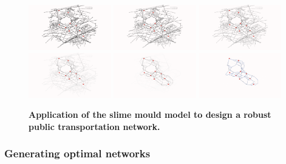 \documentclass[runningheads,a4paper]{llncs2e/llncs}
\begin{document}
\begin{figure}
	\includegraphics[width=0.32\textwidth]{figures/slimemould_tick1.png}
	\includegraphics[width=0.32\textwidth]{figures/slimemould_tick10.png}
	\includegraphics[width=0.32\textwidth]{figures/slimemould_tick20.png}\\
	\includegraphics[width=0.32\textwidth]{figures/slimemould_tick50.png}
	\includegraphics[width=0.32\textwidth]{figures/slimemould_tick101.png}
	\includegraphics[width=0.32\textwidth]{figures/slimemould_reseauFinal.png}
	\caption{\textbf{Application of the slime mould model to design a robust public transportation network.}\label{fig:romainville}}
\end{figure}



\subsubsection{Generating optimal networks}
\end{document}
